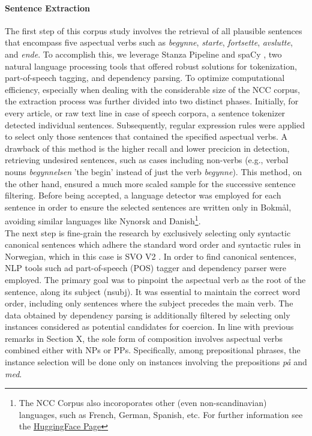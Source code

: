 \documentclass{article}
\begin{document}
\paragraph{Sentence Extraction}
The first step of this corpus study involves the retrieval of all plausible sentences that encompass five aspectual verbs such as \textit{begynne}, \textit{starte}, \textit{fortsette}, \textit{avslutte}, and \textit{ende}. 
To accomplish this, we leverage Stanza Pipeline \parencite{qi_stanza_2020} and spaCy \parencite{honnibal_spacy_2017}, two natural language processing tools that offered robust solutions for tokenization, part-of-speech tagging, and dependency parsing. To optimize computational efficiency, especially when dealing with the considerable size of the NCC corpus, the extraction process was further divided into two distinct phases. Initially, for every article, or raw text line in case of speech corpora, a sentence tokenizer detected individual sentences. Subsequently, regular expression rules were applied to select only those sentences that contained the specified aspectual verbs. 
A drawback of this method is the higher recall and lower precicion in detection, retrieving undesired sentences, such as cases including non-verbs (e.g., verbal nouns \textit{begynnelsen} 'the begin' instead of just the verb \textit{begynne}). This method, on the other hand, ensured a much more scaled sample for the successive sentence filtering. Before being accepted, a language detector was employed for each sentence in order to ensure the selected sentences are written only in Bokmål, avoiding similar languages like Nynorsk and Danish\footnote{The NCC Corpus also incoroporates other (even non-scandinavian) languages, such as French, German, Spanish, etc. For further information see the \href{https://huggingface.co/datasets/NbAiLab/NCC}{HuggingFace Page}}.\\
The next step is fine-grain the research by exclusively selecting only syntactic canonical sentences which adhere the standard word order and syntactic rules in Norwegian, which in this case is SVO V2 \parencite[pp. 858-862]{faarlund_norsk_1997}. In order to find canonical sentences, NLP tools such ad part-of-speech (POS) tagger and dependency parser were employed. The primary goal was to pinpoint the aspectual verb as the root of the sentence, along its subject (nsubj). It was essential to maintain the correct word order, including only sentences where the subject precedes the main verb. The data obtained by dependency parsing is additionally filtered by selecting only instances considered as potential candidates for coercion. In line with previous remarks in Section X, the sole form of composition involves aspectual verbs combined either with NPs or PPs. Specifically, among prepositional phrases, the instance selection  will be done only on instances involving the prepositions \emph{på} and \emph{med}. 
\end{document}
